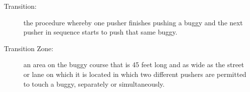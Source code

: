 \begin{description}
	\item[Transition:]
	the procedure whereby one pusher finishes pushing a buggy and the next
	pusher in sequence starts to push that same buggy.

	\item[Transition Zone:]
	an area on the buggy course that is 45 feet long and as wide as the street
	or lane on which it is located in which two different pushers are permitted to
	touch a buggy, separately or simultaneously.

\end{description}

